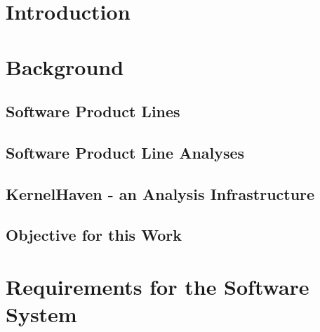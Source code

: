\documentclass[a4paper]{article}
\begin{document}
\newpage
\lhead{{}}
\rhead{\leftmark}
\pagestyle{fancy}

\listoftodos[Notes]
\clearpage

\tableofcontents
\newpage


\maketitle
\newpage

\setcounter{page}{1}
\lhead{{}}
\rhead{\leftmark}
\pagestyle{fancy}



\section{Introduction}


\section{Background}
\subsection{Software Product Lines}

\subsection{Software Product Line Analyses}

\subsection{KernelHaven - an Analysis Infrastructure}\label{kernelhaven}



\subsection{Objective for this Work}


\clearpage
\section{Requirements for the Software System}
\end{document}
